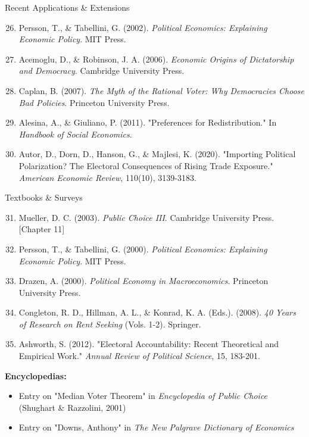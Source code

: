 \documentclass[10pt]{beamer}
\begin{document}
\begin{frame}{Recent Applications \& Extensions}
\footnotesize
\begin{enumerate}
\setcounter{enumi}{25}
\item Persson, T., \& Tabellini, G. (2002). \emph{Political Economics: Explaining Economic Policy}. MIT Press.
\item Acemoglu, D., \& Robinson, J. A. (2006). \emph{Economic Origins of Dictatorship and Democracy}. Cambridge University Press.
\item Caplan, B. (2007). \emph{The Myth of the Rational Voter: Why Democracies Choose Bad Policies}. Princeton University Press.
\item Alesina, A., \& Giuliano, P. (2011). "Preferences for Redistribution." In \emph{Handbook of Social Economics}.
\item Autor, D., Dorn, D., Hanson, G., \& Majlesi, K. (2020). "Importing Political Polarization? The Electoral Consequences of Rising Trade Exposure." \emph{American Economic Review}, 110(10), 3139-3183.
\end{enumerate}
\end{frame}

\begin{frame}{Textbooks \& Surveys}
\footnotesize
\begin{enumerate}
\setcounter{enumi}{30}
\item Mueller, D. C. (2003). \emph{Public Choice III}. Cambridge University Press. [Chapter 11]
\item Persson, T., \& Tabellini, G. (2000). \emph{Political Economics: Explaining Economic Policy}. MIT Press.
\item Drazen, A. (2000). \emph{Political Economy in Macroeconomics}. Princeton University Press.
\item Congleton, R. D., Hillman, A. L., \& Konrad, K. A. (Eds.). (2008). \emph{40 Years of Research on Rent Seeking} (Vols. 1-2). Springer.
\item Ashworth, S. (2012). "Electoral Accountability: Recent Theoretical and Empirical Work." \emph{Annual Review of Political Science}, 15, 183-201.
\end{enumerate}


\textbf{Encyclopedias:}
\begin{itemize}
\item Entry on "Median Voter Theorem" in \emph{Encyclopedia of Public Choice} (Shughart \& Razzolini, 2001)
\item Entry on "Downs, Anthony" in \emph{The New Palgrave Dictionary of Economics}
\end{itemize}
\end{frame}
\end{document}
